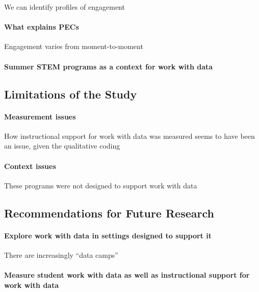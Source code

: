 \documentclass[]{msu-thesis}
\let\oldparagraph\paragraph
\renewcommand{\paragraph}[1]{\oldparagraph{#1}\mbox{}}
\theoremstyle{definition}
\theoremstyle{definition}
\theoremstyle{definition}
\theoremstyle{remark}
\begin{document}
We can identify profiles of engagement

\paragraph{What explains PECs}\label{what-explains-pecs}

Engagement varies from moment-to-moment

\paragraph{Summer STEM programs as a context for work with
data}\label{summer-stem-programs-as-a-context-for-work-with-data}

\subsection{Limitations of the Study}\label{limitations-of-the-study}

\paragraph{Measurement issues}\label{measurement-issues}

How instructional support for work with data was measured seems to have
been an issue, given the qualitative coding

\paragraph{Context issues}\label{context-issues}

These programs were not designed to support work with data

\subsection{Recommendations for Future
Research}\label{recommendations-for-future-research}

\paragraph{Explore work with data in settings designed to support
it}\label{explore-work-with-data-in-settings-designed-to-support-it}

There are increasingly ``data camps''

\paragraph{Measure student work with data as well as instructional
support for work with
data}\label{measure-student-work-with-data-as-well-as-instructional-support-for-work-with-data}
\end{document}
